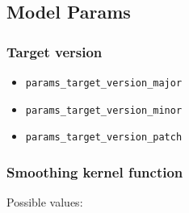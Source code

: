 
\subsection{Model Params}

\subsubsection{Target version}

\begin{itemize}
    \item \verb|params_target_version_major|
    \item \verb|params_target_version_minor|
    \item \verb|params_target_version_patch|
\end{itemize}

\subsubsection{Smoothing kernel function}
\label{sec:skf}

Possible values:

